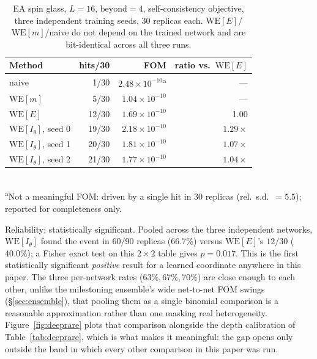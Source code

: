 \documentclass[a4paper,fleqn]{cas-sc}
\begin{document}
\begin{table}[H]
	\centering\small
	\caption{EA spin glass, $L=16$, $\mathrm{beyond}=4$, self-consistency objective,
		three independent training seeds, 30 replicas each. $\mathrm{WE}[E]$/$\mathrm{WE}[m]$/naive
		do not depend on the trained network and are bit-identical across all three runs.}
	\label{tab:selfconsistdeep}
	\begin{tabular}{lrrr}
		\toprule
		Method & hits/30 & FOM & ratio vs.\ $\mathrm{WE}[E]$ \\
		\midrule
		naive & 1/30 & $2.48\times10^{-10}$\textsuperscript{a} & --- \\
		$\mathrm{WE}[m]$ & 5/30 & $1.04\times10^{-10}$ & --- \\
		$\mathrm{WE}[E]$ & 12/30 & $1.69\times10^{-10}$ & 1.00 \\
		$\mathrm{WE}[I_\theta]$, seed 0 & 19/30 & $2.18\times10^{-10}$ & $1.29\times$ \\
		$\mathrm{WE}[I_\theta]$, seed 1 & 20/30 & $1.81\times10^{-10}$ & $1.07\times$ \\
		$\mathrm{WE}[I_\theta]$, seed 2 & 21/30 & $1.77\times10^{-10}$ & $1.04\times$ \\
		\bottomrule
	\end{tabular}
	\\[2pt]
	{\footnotesize\textsuperscript{a}Not a meaningful FOM: driven by a single hit in 30
		replicas (rel.\ s.d.\ $=5.5$); reported for completeness only.}
\end{table}

Reliability: statistically significant. Pooled across the three independent
networks, $\mathrm{WE}[I_\theta]$ found the event in $60/90$ replicas ($66.7\%$) versus
$\mathrm{WE}[E]$'s $12/30$ ($40.0\%$); a Fisher exact test on this $2\times2$ table gives
$p=0.017$. This is the first statistically significant \emph{positive} result for a
learned coordinate anywhere in this paper. The three per-network rates ($63\%, 67\%,
70\%$) are close enough to each other, unlike the milestoning ensemble's wide
net-to-net FOM swings (\S\ref{sec:ensemble}), that pooling them as a single binomial
comparison is a reasonable approximation rather than one masking real heterogeneity.
Figure~\ref{fig:deeprare} plots that comparison alongside the depth calibration of
Table~\ref{tab:deeprare}, which is what makes it meaningful: the gap opens only outside
the band in which every other comparison in this paper was run.
\end{document}
